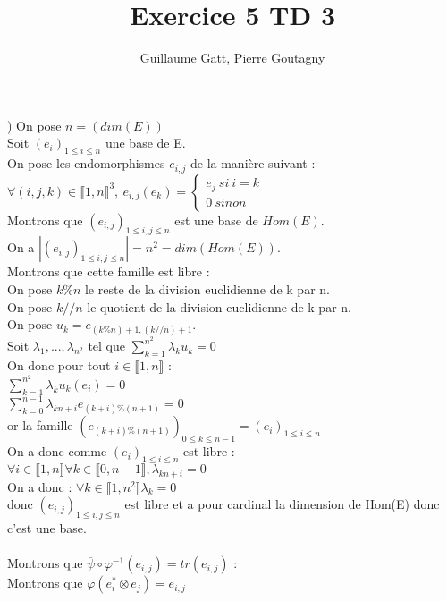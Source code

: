 \documentclass{article}
\begin{document}
\title{Exercice 5 TD 3}
\author{Guillaume Gatt, Pierre Goutagny}
) On pose $n=(dim(E))$ \\
Soit $(e_i)_{ 1\leq i \leq n}$ une base de E. \\
On pose les endomorphismes $e_{i,j}$ de la manière suivant : \\
$\forall (i,j,k) \in \llbracket 1,n\rrbracket^3,\ e_{i,j}(e_k)=\begin{cases}
e_j \ si \ i=k \\
0 \ sinon
\end{cases}$ \\
Montrons que $(e_{i,j})_{ 1\leq i,j \leq n}$ est une base de $Hom(E)$. \\
On a $|(e_{i,j})_{ 1\leq i,j \leq n}|=n^2=dim(Hom(E))$. \\
Montrons que cette famille est libre : \\
On pose $k\%n$ le reste de la division euclidienne de k par n. \\
On pose $k//n$ le quotient de la division euclidienne de k par n. \\
On pose $u_k=e_{(k\%n)+1,(k//n)+1}$. \\
Soit $\lambda_1,...,\lambda_{n^2}$ tel que $\sum_{k=1}^{n^2} \lambda_k u_k =0$ \\
On donc pour tout $i \in \llbracket1,n\rrbracket$ : \\
$\sum_{k=1}^{n^2} \lambda_k u_k(e_i) =0$ \\
$\sum_{k=0}^{n-1} \lambda_{kn+i} e_{(k+i)\% (n+1)} =0$ \\
or la famille $(e_{(k+i)\% (n+1)})_{ 0\leq k\leq n-1}=(e_i)_{ 1\leq i\leq n}$ \\
On a donc comme $(e_i)_{ 1\leq i \leq n}$ est libre : \\
$\forall i \in \llbracket1,n\rrbracket \forall k \in \llbracket0,n-1\rrbracket, \lambda_{kn+i}=0$ \\
On a donc :  $\forall k \in \llbracket1,n^2\rrbracket \lambda_k=0$ \\
donc $(e_{i,j})_{ 1\leq i,j \leq n}$ est libre et a pour cardinal la dimension de Hom(E) donc c'est une base. \\ \\
Montrons que $\overline{\psi} \circ \varphi^{-1}(e_{i,j})=tr(e_{i,j})$ : \\
Montrons que $\varphi(e^\ast_i \otimes e_{j})= e_{i,j}$ \\
\end{document}
